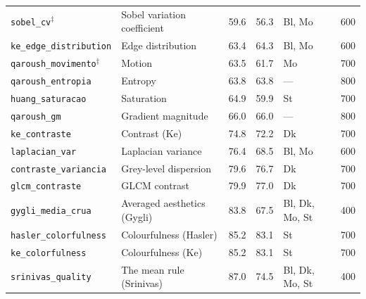 \begin{table}[!ht]
\begin{tabular}{@{}>{\raggedright\arraybackslash}p{3.0cm}>{\raggedright\arraybackslash}p{2.5cm}rr>{\raggedright\arraybackslash}p{1.35cm}r@{}}
\rowcolor{rowlight}\texttt{sobel\_\allowbreak{}cv}$^{\ddagger}$ & Sobel variation coefficient & 59.6 & 56.3 & Bl, Mo & 600 \\
\rowcolor{rowwhite}\texttt{ke\_\allowbreak{}edge\_\allowbreak{}distribution} & Edge distribution & 63.4 & 64.3 & Bl, Mo & 600 \\
\rowcolor{rowlight}\texttt{qaroush\_\allowbreak{}movimento}$^{\ddagger}$ & Motion & 63.5 & 61.7 & Mo & 700 \\
\rowcolor{rowwhite}\texttt{qaroush\_\allowbreak{}entropia} & Entropy & 63.8 & 63.8 & --- & 800 \\
\rowcolor{rowlight}\texttt{huang\_\allowbreak{}saturacao} & Saturation & 64.9 & 59.9 & St & 700 \\
\rowcolor{rowwhite}\texttt{qaroush\_\allowbreak{}gm} & Gradient magnitude & 66.0 & 66.0 & --- & 800 \\
\rowcolor{rowlight}\texttt{ke\_\allowbreak{}contraste} & Contrast (Ke) & 74.8 & 72.2 & Dk & 700 \\
\rowcolor{rowwhite}\texttt{laplacian\_\allowbreak{}var} & Laplacian variance & 76.4 & 68.5 & Bl, Mo & 600 \\
\rowcolor{rowlight}\texttt{contraste\_\allowbreak{}variancia} & Grey-level dispersion & 79.6 & 76.7 & Dk & 700 \\
\rowcolor{rowwhite}\texttt{glcm\_\allowbreak{}contraste} & GLCM contrast & 79.9 & 77.0 & Dk & 700 \\
\rowcolor{rowlight}\texttt{gygli\_\allowbreak{}media\_\allowbreak{}crua} & Averaged aesthetics (Gygli) & 83.8 & 67.5 & Bl, Dk, Mo, St & 400 \\
\rowcolor{rowwhite}\texttt{hasler\_\allowbreak{}colorfulness} & Colourfulness (Hasler) & 85.2 & 83.1 & St & 700 \\
\rowcolor{rowlight}\texttt{ke\_\allowbreak{}colorfulness} & Colourfulness (Ke) & 85.2 & 83.1 & St & 700 \\
\rowcolor{rowwhite}\texttt{srinivas\_\allowbreak{}quality} & The mean rule (Srinivas) & 87.0 & 74.5 & Bl, Dk, Mo, St & 400 \\
\bottomrule
\end{tabular}
\end{table}
